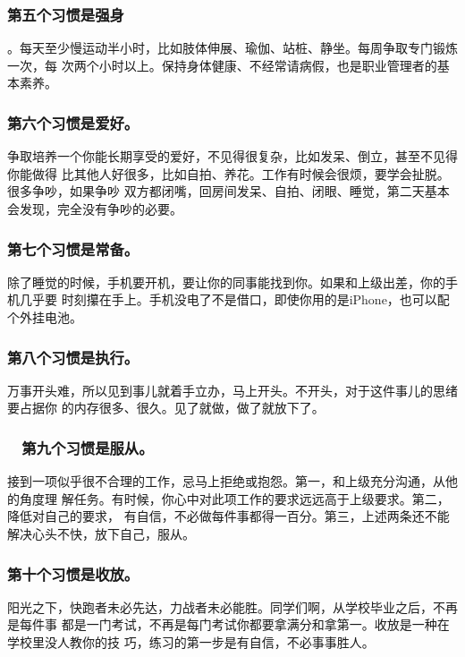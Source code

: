 \documentclass[11pt]{ctexart}
\begin{document}
\subsubsection{第五个习惯是强身}
\label{sec:orgheadline61}
。每天至少慢运动半小时，比如肢体伸展、瑜伽、站桩、静坐。每周争取专门锻炼一次，每
次两个小时以上。保持身体健康、不经常请病假，也是职业管理者的基本素养。

\subsubsection{第六个习惯是爱好。}
\label{sec:orgheadline62}
争取培养一个你能长期享受的爱好，不见得很复杂，比如发呆、倒立，甚至不见得你能做得
比其他人好很多，比如自拍、养花。工作有时候会很烦，要学会扯脱。很多争吵，如果争吵
双方都闭嘴，回房间发呆、自拍、闭眼、睡觉，第二天基本会发现，完全没有争吵的必要。

\subsubsection{第七个习惯是常备。}
\label{sec:orgheadline63}
除了睡觉的时候，手机要开机，要让你的同事能找到你。如果和上级出差，你的手机几乎要
时刻攥在手上。手机没电了不是借口，即使你用的是iPhone，也可以配个外挂电池。

\subsubsection{第八个习惯是执行。}
\label{sec:orgheadline64}
万事开头难，所以见到事儿就着手立办，马上开头。不开头，对于这件事儿的思绪要占据你
的内存很多、很久。见了就做，做了就放下了。

\subsubsection{　第九个习惯是服从。}
\label{sec:orgheadline65}
接到一项似乎很不合理的工作，忌马上拒绝或抱怨。第一，和上级充分沟通，从他的角度理
解任务。有时候，你心中对此项工作的要求远远高于上级要求。第二，降低对自己的要求，
有自信，不必做每件事都得一百分。第三，上述两条还不能解决心头不快，放下自己，服从。

\subsubsection{第十个习惯是收放。}
\label{sec:orgheadline66}
阳光之下，快跑者未必先达，力战者未必能胜。同学们啊，从学校毕业之后，不再是每件事
都是一门考试，不再是每门考试你都要拿满分和拿第一。收放是一种在学校里没人教你的技
巧，练习的第一步是有自信，不必事事胜人。
\end{document}
